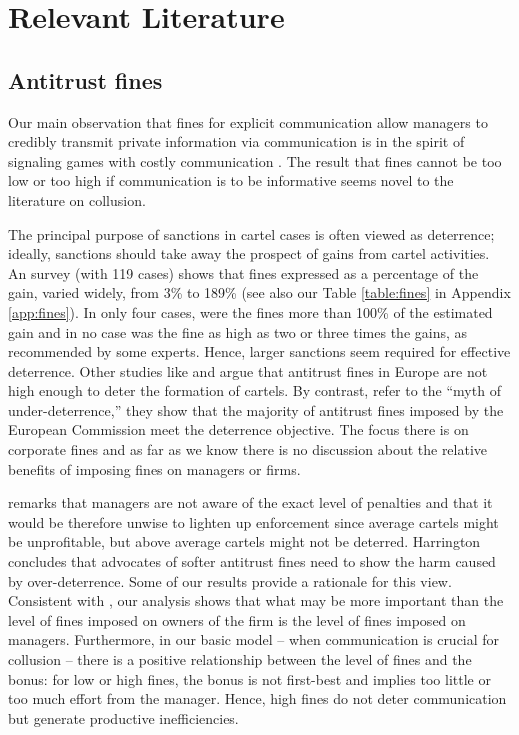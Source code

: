 \documentclass[]{article}
\begin{document}
\section{Relevant Literature}
%
\subsection{Antitrust fines}
Our main observation that fines for explicit communication allow managers to credibly transmit private information via communication is in the spirit of signaling games with costly communication \citep{Spence1973}. The result that fines cannot be too low or too high if communication is to be informative seems novel to the literature on collusion.

The principal purpose of sanctions in cartel cases is often viewed as deterrence; ideally, sanctions should take away the prospect of gains from cartel activities. An \cite{OECD2009} survey (with 119 cases) shows that fines expressed as a percentage of the gain, varied widely, from 3\% to 189\% (see also our Table \ref{table:fines} in Appendix \ref{app:fines}). In only four cases, were the fines more than 100\% of the estimated gain and in no case was the fine as high as two or three times the gains, as recommended by some experts. Hence, larger sanctions seem required for effective deterrence. Other studies like \cite{combe2011fines} and \cite{connor2012cartels} argue that antitrust fines in Europe are not high enough to deter the formation of cartels. By contrast, \cite{allain2011determination} refer to the ``myth of under-deterrence,'' they show that the majority of antitrust fines imposed by the European Commission meet the deterrence objective. The focus there is on corporate fines and as far as we know there is no discussion about the relative benefits of imposing fines on managers or firms.

\cite{harringtonjr2014} remarks that managers are not aware of the exact level of penalties and that it would be therefore unwise to lighten up enforcement since average cartels might be unprofitable, but above average cartels might not be deterred. Harrington concludes that advocates of softer antitrust fines need to show the harm caused by over-deterrence. Some of our results provide a rationale for this view. Consistent with \cite{harringtonjr2014}, our analysis shows that what may be more important than the level of fines imposed on owners of the firm is the level of fines imposed on managers. Furthermore, in our basic model -- when communication is crucial for collusion -- there is a positive relationship between the level of fines and the bonus: for low or high fines, the bonus is not first-best and implies too little or too much effort from the manager. Hence, high fines do not deter communication but generate productive inefficiencies. 
\end{document}
